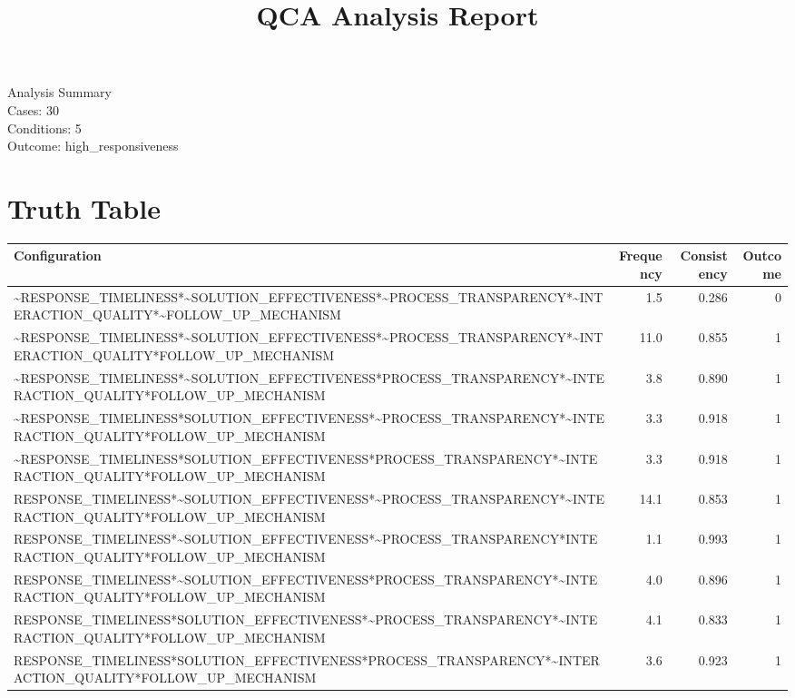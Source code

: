 \documentclass[12pt,a4paper]{article}
\title{QCA Analysis Report}
\begin{document}
\maketitle
\begin{center}
\large
Analysis Summary \\
Cases: 30 \\
Conditions: 5 \\
Outcome: high\_responsiveness
\end{center}
\newpage

\tableofcontents

\newpage


\section{Truth Table}
\begin{longtable}{lrrr}
\toprule
Configuration & Frequency & Consistency & Outcome \\
\midrule
    \textasciitilde{}RESPONSE\_TIMELINESS*\textasciitilde{}SOLUTION\_EFFECTIVENESS*\textasciitilde{}PROCESS\_TRANSPARENCY*\textasciitilde{}INTERACTION\_QUALITY*\textasciitilde{}FOLLOW\_UP\_MECHANISM & 1.5 & 0.286 & 0 \\
    \textasciitilde{}RESPONSE\_TIMELINESS*\textasciitilde{}SOLUTION\_EFFECTIVENESS*\textasciitilde{}PROCESS\_TRANSPARENCY*\textasciitilde{}INTERACTION\_QUALITY*FOLLOW\_UP\_MECHANISM & 11.0 & 0.855 & 1 \\
    \textasciitilde{}RESPONSE\_TIMELINESS*\textasciitilde{}SOLUTION\_EFFECTIVENESS*PROCESS\_TRANSPARENCY*\textasciitilde{}INTERACTION\_QUALITY*FOLLOW\_UP\_MECHANISM & 3.8 & 0.890 & 1 \\
    \textasciitilde{}RESPONSE\_TIMELINESS*SOLUTION\_EFFECTIVENESS*\textasciitilde{}PROCESS\_TRANSPARENCY*\textasciitilde{}INTERACTION\_QUALITY*FOLLOW\_UP\_MECHANISM & 3.3 & 0.918 & 1 \\
    \textasciitilde{}RESPONSE\_TIMELINESS*SOLUTION\_EFFECTIVENESS*PROCESS\_TRANSPARENCY*\textasciitilde{}INTERACTION\_QUALITY*FOLLOW\_UP\_MECHANISM & 3.3 & 0.918 & 1 \\
    RESPONSE\_TIMELINESS*\textasciitilde{}SOLUTION\_EFFECTIVENESS*\textasciitilde{}PROCESS\_TRANSPARENCY*\textasciitilde{}INTERACTION\_QUALITY*FOLLOW\_UP\_MECHANISM & 14.1 & 0.853 & 1 \\
    RESPONSE\_TIMELINESS*\textasciitilde{}SOLUTION\_EFFECTIVENESS*\textasciitilde{}PROCESS\_TRANSPARENCY*INTERACTION\_QUALITY*FOLLOW\_UP\_MECHANISM & 1.1 & 0.993 & 1 \\
    RESPONSE\_TIMELINESS*\textasciitilde{}SOLUTION\_EFFECTIVENESS*PROCESS\_TRANSPARENCY*\textasciitilde{}INTERACTION\_QUALITY*FOLLOW\_UP\_MECHANISM & 4.0 & 0.896 & 1 \\
    RESPONSE\_TIMELINESS*SOLUTION\_EFFECTIVENESS*\textasciitilde{}PROCESS\_TRANSPARENCY*\textasciitilde{}INTERACTION\_QUALITY*FOLLOW\_UP\_MECHANISM & 4.1 & 0.833 & 1 \\
    RESPONSE\_TIMELINESS*SOLUTION\_EFFECTIVENESS*PROCESS\_TRANSPARENCY*\textasciitilde{}INTERACTION\_QUALITY*FOLLOW\_UP\_MECHANISM & 3.6 & 0.923 & 1 \\
\bottomrule
\end{longtable}
\end{document}
